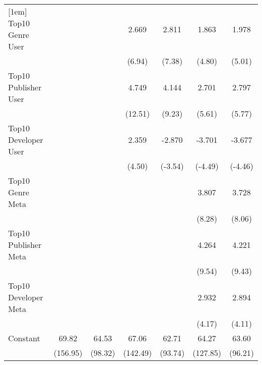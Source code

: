 \documentclass{article}
\begin{document}
\begin{table}[htbp]
\begin{tabular}{l*{6}{c}}
[1em]
Top10 Genre User    &                     &                     &       2.669\sym{***}&       2.811\sym{***}&       1.863\sym{***}&       1.978\sym{***}\\
                    &                     &                     &      (6.94)         &      (7.38)         &      (4.80)         &      (5.01)         \\
[1em]
Top10 Publisher User&                     &                     &       4.749\sym{***}&       4.144\sym{***}&       2.701\sym{***}&       2.797\sym{***}\\
                    &                     &                     &     (12.51)         &      (9.23)         &      (5.61)         &      (5.77)         \\
[1em]
Top10 Developer User&                     &                     &       2.359\sym{***}&      -2.870\sym{***}&      -3.701\sym{***}&      -3.677\sym{***}\\
                    &                     &                     &      (4.50)         &     (-3.54)         &     (-4.49)         &     (-4.46)         \\
[1em]
Top10 Genre Meta    &                     &                     &                     &                     &       3.807\sym{***}&       3.728\sym{***}\\
                    &                     &                     &                     &                     &      (8.28)         &      (8.06)         \\
[1em]
Top10 Publisher Meta&                     &                     &                     &                     &       4.264\sym{***}&       4.221\sym{***}\\
                    &                     &                     &                     &                     &      (9.54)         &      (9.43)         \\
[1em]
Top10 Developer Meta&                     &                     &                     &                     &       2.932\sym{***}&       2.894\sym{***}\\
                    &                     &                     &                     &                     &      (4.17)         &      (4.11)         \\
[1em]
Constant            &       69.82\sym{***}&       64.53\sym{***}&       67.06\sym{***}&       62.71\sym{***}&       64.27\sym{***}&       63.60\sym{***}\\
                    &    (156.95)         &     (98.32)         &    (142.49)         &     (93.74)         &    (127.85)         &     (96.21)         \\

\end{tabular}
\end{table}
\end{document}
